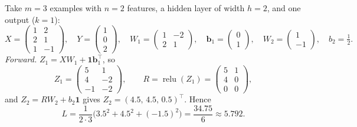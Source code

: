 \begin{example}\label{exa:numeric-backprop}
Take $m=3$ examples with $n=2$ features, a hidden layer of width $h=2$, and one
output ($k=1$):
\[
  X=\begin{pmatrix}1&2\\2&1\\1&-1\end{pmatrix},\quad
  Y=\begin{pmatrix}1\\0\\2\end{pmatrix},\quad
  W_1=\begin{pmatrix}1&-2\\2&1\end{pmatrix},\quad
  \mathbf{b}_1=\begin{pmatrix}0\\1\end{pmatrix},\quad
  W_2=\begin{pmatrix}1\\-1\end{pmatrix},\quad
  b_2=\tfrac12.
\]
\emph{Forward.} $Z_1=XW_1+\mathbf{1}\mathbf{b}_1^{\!\top}$, so
\[
  Z_1=\begin{pmatrix}5&1\\4&-2\\-1&-2\end{pmatrix},\qquad
  R=\operatorname{relu}(Z_1)=\begin{pmatrix}5&1\\4&0\\0&0\end{pmatrix},
\]
and $Z_2=RW_2+b_2\mathbf{1}$ gives
$Z_2=(4.5,\,4.5,\,0.5)^{\!\top}$. Hence
\[
  L=\frac{1}{2\cdot3}\bigl(3.5^2+4.5^2+(-1.5)^2\bigr)=\frac{34.75}{6}\approx5.792.
\]


\end{example}
